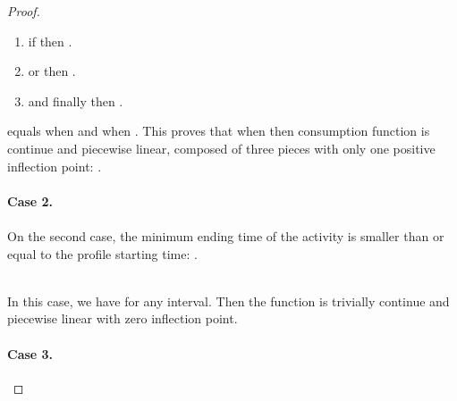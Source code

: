\documentclass{llncs}
\begin{document}
{\begin{proof}
\begin{enumerate}
\item if  then .
\item or  then .
\item and finally  then .
\end{enumerate}

\noindent  equals  when  and  when .
This proves that when  then consumption function is continue and piecewise linear, composed of three pieces with only one positive inflection point: . 


\paragraph{Case 2.}
\paragraph{}
\hspace{-0.15cm}\begin{minipage}{0.45\textwidth} 
On the second case, the minimum ending time of the activity  is smaller than or equal to the profile starting time:
.
\end{minipage}
\begin{minipage}{0.45\textwidth} 
   \hspace{0.5cm}
\label{Fig:case2}
\end{minipage}\\
\noindent In this case, we have  for any interval. Then the function is trivially continue and piecewise linear with zero inflection point. \paragraph{Case 3.}

\end{proof}}
\end{document}
